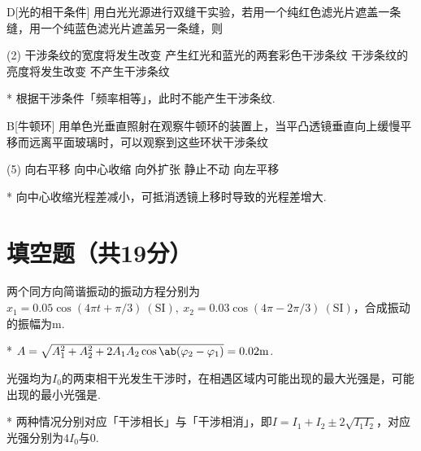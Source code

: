 \begin{choice}{D}[光的相干条件]
    用白光光源进行双缝干实验，若用一个纯红色滤光片遮盖一条缝，用一个纯蓝色滤光片遮盖另一条缝，则
    \begin{tasks}(2)
        \task 干涉条纹的宽度将发生改变
        \task 产生红光和蓝光的两套彩色干涉条纹
        \task 干涉条纹的亮度将发生改变
        \task 不产生干涉条纹
    \end{tasks}
\end{choice}
\begin{solution}*
    根据干涉条件「频率相等」，此时不能产生干涉条纹.
\end{solution}

\begin{choice}{B}[牛顿环]
    用单色光垂直照射在观察牛顿环的装置上，当平凸透镜垂直向上缓慢平移而远离平面玻璃时，可以观察到这些环状干涉条纹
    \begin{tasks}(5)
        \task 向右平移
        \task 向中心收缩
        \task 向外扩张
        \task 静止不动
        \task 向左平移
    \end{tasks}
\end{choice}
\begin{solution}*
    向中心收缩光程差减小，可抵消透镜上移时导致的光程差增大.
\end{solution}

\section{填空题（共19分）}
\begin{problem}[简谐振动的合成][2]
    两个同方向简谐振动的振动方程分别为$x_1=0.05\cos(4\pi t+\pi/3)\ (\mathrm{SI}),\ x_2=0.03\cos(4\pi-2\pi/3)\ (\mathrm{SI})$，合成振动的振幅为$\mathrm{m}$.
\end{problem}
\begin{solution}*
    $A=\sqrt{A_1^2+A_2^2+2A_1A_2\cos{\ab(\varphi_2-\varphi_1)}}=0.02\mathrm{m}$.
\end{solution}

\begin{problem}[相干光的叠加后的光强分布][4]
    光强均为$I_0$的两束相干光发生干涉时，在相遇区域内可能出现的最大光强是，可能出现的最小光强是.
\end{problem}
\begin{solution}*
    两种情况分别对应「干涉相长」与「干涉相消」，即$I=I_1+I_2\pm 2\sqrt{I_1I_2}$，对应光强分别为$4I_0$与$0$.
\end{solution}

